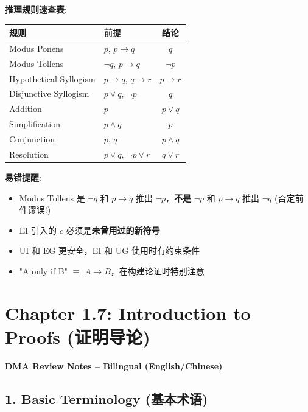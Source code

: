 \documentclass[10pt,a4paper,openany]{ctexbook}
\theoremstyle{definition}
\theoremstyle{remark}
\renewenvironment{quote}
  {\list{}{\leftmargin=1em\rightmargin=0pt\topsep=0.5pt\partopsep=0pt}\item[]}
  {\endlist}
\begin{document}
\textbf{推理规则速查表}:
\begin{center}
\begin{tabular}{llc}
\hline
规则 & 前提 & 结论 \\ \hline
Modus Ponens & $p$, $p\to q$ & $q$ \\
Modus Tollens & $\neg q$, $p\to q$ & $\neg p$ \\
Hypothetical Syllogism & $p\to q$, $q\to r$ & $p\to r$ \\
Disjunctive Syllogism & $p\lor q$, $\neg p$ & $q$ \\
Addition & $p$ & $p\lor q$ \\
Simplification & $p\land q$ & $p$ \\
Conjunction & $p$, $q$ & $p\land q$ \\
Resolution & $p\lor q$, $\neg p\lor r$ & $q\lor r$ \\
\hline
\end{tabular}

\end{center}

\textbf{易错提醒}:
\begin{itemize}
\item Modus Tollens 是 $\neg q$ 和 $p\to q$ 推出 $\neg p$，\textbf{不是} $\neg p$ 和 $p\to q$ 推出 $\neg q$ (否定前件谬误!)
\item EI 引入的 $c$ 必须是\textbf{未曾用过的新符号}
\item UI 和 EG 更安全，EI 和 UG 使用时有约束条件
\item "A only if B" $\equiv$ $A \to B$，在构建论证时特别注意

\end{itemize}


\section{Chapter 1.7: Introduction to Proofs (证明导论)}

\begin{quote}
\textbf{DMA Review Notes -- Bilingual (English/Chinese)}

\end{quote}
\vspace{-2pt}

\subsection{1. Basic Terminology (基本术语)}
\end{document}
